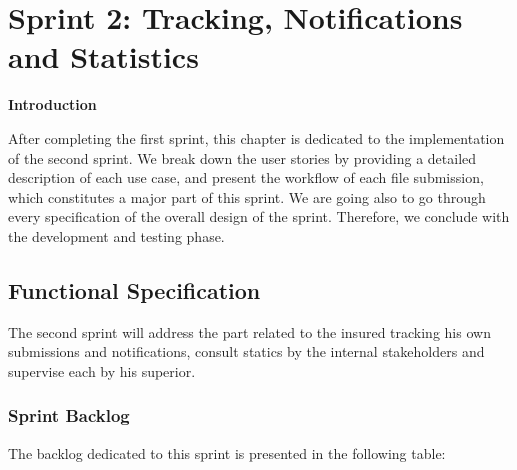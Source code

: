 \chapter{Sprint 2:  Tracking, Notifications and Statistics}
\newpage
\begin{center}
    \centering
    \LARGE\textbf{Introduction} 
     \vspace{1cm} \\
   \raggedright
\end{center}
After completing the first sprint, this chapter is dedicated to the implementation of the second sprint.  
We break down the user stories by providing a detailed description of each use case, and present the workflow of each file submission, which constitutes a major part of this sprint.  
We are going also to go through every specification of the overall design of the sprint. Therefore, we conclude with the development and testing phase.
\section{Functional Specification} 
The second sprint will address the part related to the insured tracking his own submissions and notifications, consult statics by the internal stakeholders and supervise each by his superior.

\subsection{Sprint Backlog}
The backlog dedicated to this sprint is presented in the following table:
\renewcommand{\arraystretch}{1.2}
\setlength{\tabcolsep}{6pt}

